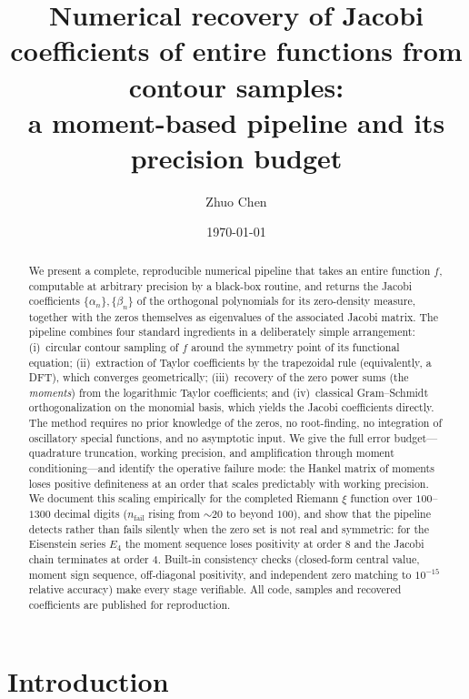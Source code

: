 \documentclass[11pt]{article}
\title{Numerical recovery of Jacobi coefficients of entire functions from contour samples:\\
a moment-based pipeline and its precision budget}
\author[1]{Zhuo Chen}
\affil[1]{Independent researcher\\
ORCID: 0009-0006-9172-8268\\
\href{https://github.com/maomao8412/hilbert-polya-jacobi}{github.com/maomao8412/hilbert-polya-jacobi}}
\date{\today}
\theoremstyle{definition}
\begin{document}
\maketitle

\begin{abstract}
We present a complete, reproducible numerical pipeline that takes an
entire function $f$, computable at arbitrary precision by a black-box
routine, and returns the Jacobi coefficients $\{\alpha_n\},\{\beta_n\}$
of the orthogonal polynomials for its zero-density measure, together
with the zeros themselves as eigenvalues of the associated Jacobi
matrix. The pipeline combines four standard ingredients in a
deliberately simple arrangement: (i)~circular contour sampling of $f$
around the symmetry point of its functional equation; (ii)~extraction
of Taylor coefficients by the trapezoidal rule (equivalently, a DFT),
which converges geometrically; (iii)~recovery of the zero power sums
(the \emph{moments}) from the logarithmic Taylor coefficients; and
(iv)~classical Gram--Schmidt orthogonalization on the monomial basis,
which yields the Jacobi coefficients directly.
The method requires no prior knowledge of the zeros, no root-finding,
no integration of oscillatory special functions, and no asymptotic
input. We give the full error budget---quadrature truncation, working
precision, and amplification through moment conditioning---and
identify the operative failure mode: the Hankel matrix of moments
loses positive definiteness at an order that scales predictably with
working precision. We document this scaling empirically for the
completed Riemann $\xi$ function over $100$--$1300$ decimal digits
($n_{\text{fail}}$ rising from $\sim 20$ to beyond $100$), and show
that the pipeline detects rather than fails silently when the zero
set is not real and symmetric: for the Eisenstein series $E_4$ the
moment sequence loses positivity at order $8$ and the Jacobi chain
terminates at order $4$. Built-in consistency checks (closed-form
central value, moment sign sequence, off-diagonal positivity, and
independent zero matching to $10^{-15}$ relative accuracy) make every
stage verifiable. All code, samples and recovered coefficients are
published for reproduction.
\end{abstract}

\section{Introduction}\label{sec:intro}
\end{document}

